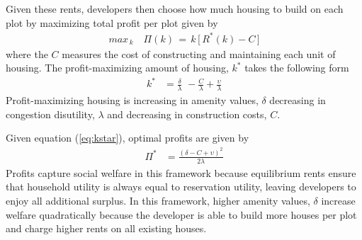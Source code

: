 \documentclass[12pt]{article}
\begin{document}
Given these rents, developers then choose how much housing to build on each plot by maximizing total profit per plot given by
\begin{align*}
max_{\,k} \,\,\,\,\,\, \Pi(k) \,=\, k \, \Big[ \, R^{*}(k) - C \, \Big ]
\end{align*}
\noindent where the $C$ measures the cost of constructing and maintaining each unit of housing.  The profit-maximizing amount of housing, $k^{*}$ takes the following form
\begin{align}
\label{eq:kstar}
k^{*} &= \frac{\delta}{\lambda} \,\, - \frac{C}{\lambda} + \frac{\upsilon}{\lambda}
\end{align}
Profit-maximizing housing is increasing in amenity values, $\delta$ decreasing in congestion disutility, $\lambda$ and decreasing in construction costs, $C$.  

Given equation (\ref{eq:kstar}), optimal profits are given by
\begin{align}
\label{eq:profits1}
\Pi^{*}  &= \frac{(\delta-C + \upsilon )^2}{2\lambda}
\end{align}
Profits capture social welfare in this framework because equilibrium rents ensure that household utility is always equal to reservation utility, leaving developers to enjoy all additional surplus.  In this framework, higher amenity values, $\delta$ increase welfare quadratically because the developer is able to build more houses per plot and charge higher rents on all existing houses.
\end{document}
